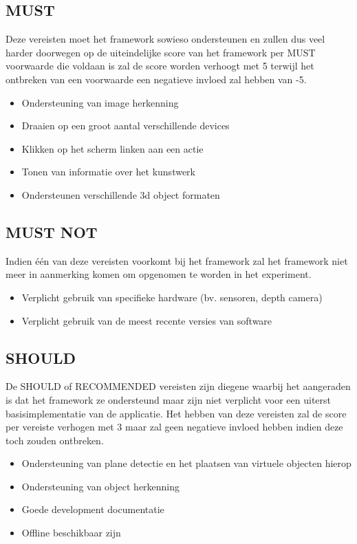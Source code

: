 \subsection{MUST}
Deze vereisten moet het framework sowieso ondersteunen en zullen dus veel harder doorwegen op de uiteindelijke score van het framework per MUST voorwaarde die voldaan is zal de score worden verhoogt met 5 terwijl het ontbreken van een voorwaarde een negatieve invloed zal hebben van -5.
\begin{itemize}
    \item Ondersteuning van image herkenning
    \item Draaien op een groot aantal verschillende devices
    \item Klikken op het scherm linken aan een actie
    \item Tonen van informatie over het kunstwerk
    \item Ondersteunen verschillende 3d object formaten
\end{itemize} 

\subsection{MUST NOT}
Indien één van deze vereisten voorkomt bij het framework zal het framework niet meer in aanmerking komen om opgenomen te worden in het experiment.
\begin{itemize}
    \item Verplicht gebruik van specifieke hardware (bv. sensoren, depth camera)
    \item Verplicht gebruik van de meest recente versies van software
\end{itemize} 

\subsection{SHOULD}
De SHOULD of RECOMMENDED vereisten zijn diegene waarbij het aangeraden is dat het framework ze ondersteund maar zijn niet verplicht voor een uiterst basisimplementatie van de applicatie. Het hebben van deze vereisten zal de score per vereiste verhogen met 3 maar zal geen negatieve invloed hebben indien deze toch zouden ontbreken.
\begin{itemize}
    \item Ondersteuning van plane detectie en het plaatsen van virtuele objecten hierop
    \item Ondersteuning van object herkenning
    \item Goede development documentatie
    \item Offline beschikbaar zijn
\end{itemize} 


